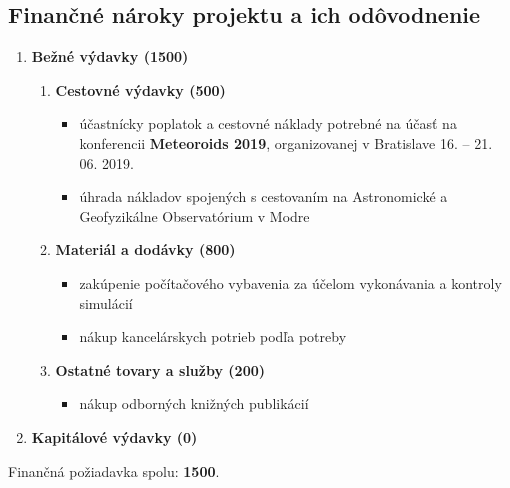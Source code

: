 \subsection{Finančné nároky projektu a ich
odôvodnenie}\label{finanux10dnuxe9-nuxe1roky-projektu-a-ich-oduxf4vodnenie}

\begin{enumerate}
\def\labelenumi{\arabic{enumi}.}
\tightlist
\item
  \textbf{Bežné výdavky (\SI{1500}{\eur})}

  \begin{enumerate}
  \def\labelenumii{\alph{enumii}.}
  \tightlist
  \item
    \textbf{Cestovné výdavky (\SI{500}{\eur})}

    \begin{itemize}
    \tightlist
    \item
      účastnícky poplatok a cestovné náklady potrebné na účasť na
      konferencii \textbf{Meteoroids 2019}, organizovanej v Bratislave
      16. -- 21. 06. 2019.
    \item
      úhrada nákladov spojených s cestovaním na Astronomické a
      Geofyzikálne Observatórium v Modre
    \end{itemize}
  \item
    \textbf{Materiál a dodávky (\SI{800}{\eur})}

    \begin{itemize}
    \tightlist
    \item
      zakúpenie počítačového vybavenia za účelom vykonávania a kontroly
      simulácií
    \item
      nákup kancelárskych potrieb podľa potreby
    \end{itemize}
  \item
    \textbf{Ostatné tovary a služby (\SI{200}{\eur})}

    \begin{itemize}
    \tightlist
    \item
      nákup odborných knižných publikácií
    \end{itemize}
  \end{enumerate}
\item
  \textbf{Kapitálové výdavky (\SI{0}{\eur})}
\end{enumerate}

Finančná požiadavka spolu: \textbf{\SI{1500}{\eur}}.
